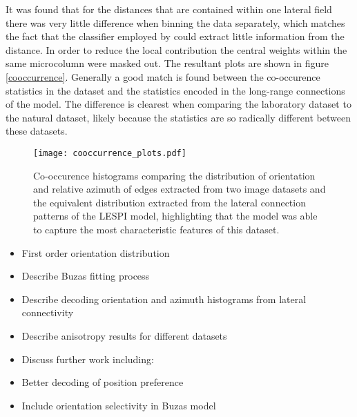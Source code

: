 It was found that for the distances that are contained within one
lateral field there was very little difference when binning the data
separately, which matches the fact that the classifier employed by
\cite{Perrinet2015} could extract little information from the
distance. In order to reduce the local contribution the central
weights within the same microcolumn were masked out. The resultant
plots are shown in figure \ref{cooccurrence}. Generally a good match is
found between the co-occurence statistics in the dataset and the
statistics encoded in the long-range connections of the model. The
difference is clearest when comparing the laboratory dataset to the
natural dataset, likely because the statistics are so radically
different between these datasets.

\begin{figure}
	\centering
        \texttt{[image: cooccurrence\_plots.pdf]}
	\caption{Co-occurence histograms comparing the distribution of
          orientation and relative azimuth of edges extracted from two
          image datasets and the equivalent distribution extracted
          from the lateral connection patterns of the LESPI model,
          highlighting that the model was able to capture the most
          characteristic features of this dataset.}
	\label{cooccurence}
\end{figure}


\begin{itemize}
\item First order orientation distribution
\item Describe Buzas fitting process
\item Describe decoding orientation and azimuth histograms from lateral
  connectivity
\item Describe anisotropy results for different datasets
\item Discuss further work including:
\item Better decoding of position preference
\item Include orientation selectivity in Buzas model
\end{itemize}
